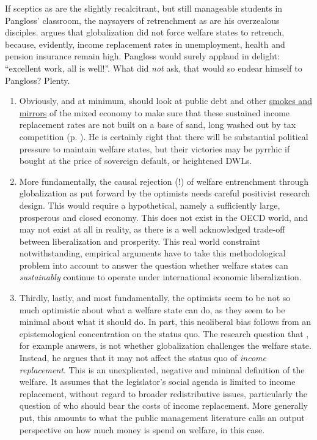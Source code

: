 \documentclass[11pt,a4paper,oneside,openright]{article}
\begin{document}
If sceptics as \citeauthor{Beckfield2006} are the slightly recalcitrant, but still manageable students in Pangloss' classroom, the naysayers of retrenchment as \cite{Swank-2005-aa} are his overzealous disciples. 
\citeauthor{Swank-2005-aa} argues that globalization did not force welfare states to retrench, because, evidently, income replacement rates in unemployment, health and pension insurance remain high. 
Pangloss would surely applaud in delight: 
``excellent work, all is well!''. 
What did \citeauthor{Swank-2005-aa} \emph{not} ask, that would so endear himself to Pangloss? 
Plenty. 
\begin{enumerate}
	\item Obviously, and at minimum, \citeauthor{Swank-2005-aa} should look at public debt and other \hyperref[sec:smoke-n-mirrors]{smokes and mirrors} of the mixed economy to make sure that these sustained income replacement rates are not built on a base of sand, long washed out by tax competition (p. \pageref{sec:smoke-n-mirrors}). 
	He is certainly right that there will be substantial political pressure to maintain welfare states, but their victories may be pyrrhic if bought at the price of sovereign default, or heightened \glspl{DWL}.
	\item More fundamentally, the causal rejection (!) of welfare entrenchment through globalization as put forward by the optimists needs careful positivist research design. 
	 This would require a hypothetical, namely a sufficiently large, prosperous and closed economy. 
	 This does not exist in the OECD world, and may not exist at all in reality, as there is a well acknowledged trade-off between liberalization and prosperity. 
	 This real world constraint notwithstanding, empirical arguments have to take this methodological problem into account to answer the question whether welfare states can \emph{sustainably} continue to operate under international economic liberalization.
	\item Thirdly, lastly, and most fundamentally, the optimists seem to be not so much optimistic about what a welfare state can do, as they seem to be minimal about what it should do. 
	In part, this neoliberal bias follows from an epistemological concentration on the status quo. 
	The research question that \citeauthor{Swank-2005-aa}, for example answers, is not whether globalization challenges the welfare state. 
	Instead, he argues that it may not affect the status quo of \emph{income replacement}. 
	This is an unexplicated, negative and minimal definition of the welfare. 
	It assumes that the legislator’s social agenda is limited to income replacement, without regard to broader redistributive issues, particularly the question of who should bear the costs of income replacement. 
	More generally put, this amounts to what the public management literature calls an output perspective on how much money is spend on welfare, in this case.
\end{enumerate}
 
\end{document}
